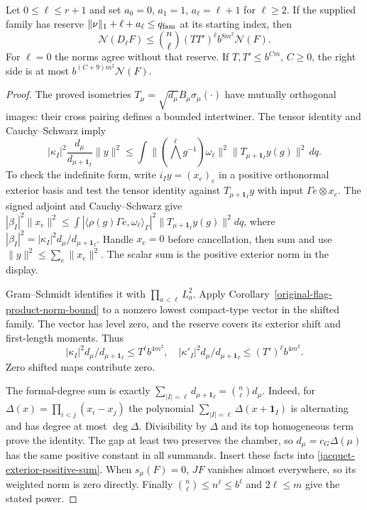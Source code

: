 \begin{theorem}\label{jacquet-leading-minor-integer-family}
Let $0\le\ell\le r+1$ and set
$a_0=0$, $a_1=1$, $a_\ell=\ell+1$ for $\ell\ge2$.
If the supplied family has reserve
$\|\nu\|_1+\ell+a_\ell\le q_{\rm fam}$ at its starting index, then
\[
 \mathcal N(D_\ell F)
 \le\binom{n}{\ell}(TT')^\ell b^{8m^2}\mathcal N(F).
\]
For $\ell=0$ the norms agree without that reserve.
If $T,T'\le b^{Cm}$, $C\ge0$, the right side is at most
$b^{(C+9)m^2}\mathcal N(F)$.
\end{theorem}
\begin{proof}
The proved isometries
$T_\mu=\sqrt{d_\mu}B_\mu\sigma_\mu(\cdot)$ have mutually
orthogonal images: their cross pairing defines a bounded
intertwiner. The tensor identity and Cauchy--Schwarz imply
\[
 |\kappa_I|^2\frac{d_\mu}{d_{\mu+\mathbf1_I}}\|y\|^2
 \le\int\|(\bigwedge^\ell g^{-1})\omega_\ell\|^2
                   \|T_{\mu+\mathbf1_I}y(g)\|^2\,dq.
\]
To check the indefinite form, write $i_Iy=(x_e)_e$ in a
positive orthonormal exterior basis and test the tensor identity
against $T_{\mu+\mathbf1_I}y$ with input $\Gamma e\otimes x_e$.
The signed adjoint and Cauchy--Schwarz give
$|\beta_I|^2\|x_e\|^2
 \le\int|\langle\rho(g)\Gamma e,\omega_\ell\rangle_\Gamma|^2
                  \|T_{\mu+\mathbf1_I}y(g)\|^2dq$,
where $|\beta_I|^2=|\kappa_I|^2d_\mu/d_{\mu+\mathbf1_I}$.
Handle $x_e=0$ before cancellation, then sum and use
$\|y\|^2\le\sum_e\|x_e\|^2$. The scalar sum is the positive
exterior norm in the display.

Gram--Schmidt identifies it with $\prod_{a<\ell}L_a^2$.
Apply Corollary~\ref{original-flag-product-norm-bound}
to a nonzero lowest compact-type vector in the shifted family.
The vector has level zero, and the reserve covers its exterior
shift and first-length moments. Thus
\[
 |\kappa_I|^2d_\mu/d_{\mu+\mathbf1_I}\le T^\ell b^{4m^2},
 \quad
 |\kappa'_I|^2d_\mu/d_{\mu+\mathbf1_I}\le(T')^\ell b^{4m^2}.
\]
Zero shifted maps contribute zero.

The formal-degree sum is exactly
$\sum_{|I|=\ell}d_{\mu+\mathbf1_I}=\binom{n}{\ell}d_\mu$.
Indeed, for $\Delta(x)=\prod_{i<j}(x_i-x_j)$ the polynomial
$\sum_{|I|=\ell}\Delta(x+\mathbf1_I)$ is alternating and has
degree at most $\deg\Delta$. Divisibility by $\Delta$ and its
top homogeneous term prove the identity. The gap at least two
preserves the chamber, so $d_\mu=c_G\Delta(\mu)$ has the same
positive constant in all summands.
Insert these facts into \eqref{jacquet-exterior-positive-sum}.
When $s_\mu(F)=0$, $JF$ vanishes almost everywhere, so its
weighted norm is zero directly. Finally
$\binom{n}{\ell}\le n^\ell\le b^\ell$ and $2\ell\le m$ give
the stated power.
\end{proof}

